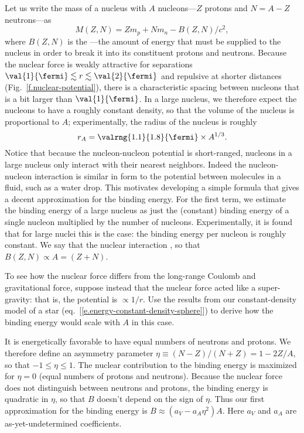  Let us write the mass of a nucleus with $A$ nucleons---$Z$ protons and $N=A-Z$ neutrons---as
\[
	M(Z,N) = Zm_{p} + Nm_{n} - B(Z,N)/c^{2},
\]
where $B(Z,N)$ is the ---the amount of energy that must be supplied to the nucleus in order to break it into its constituent protons and neutrons.
Because the nuclear force is weakly attractive for separations $\val{1}{\fermi}\lesssim r\lesssim\val{2}{\fermi}$ and repulsive at shorter distances (Fig.~\ref{f.nuclear-potential}), there is a characteristic spacing between nucleons that is a bit larger than $\val{1}{\fermi}$. In a large nucleus, we therefore expect the nucleons to have a roughly constant density, so that the volume of the nucleus is proportional to $A$; experimentally, the radius of the nucleus is roughly
\[
	r_{A} = \valrng{1.1}{1.8}{\fermi}\times A^{1/3}.
\]
Notice that because the nucleon-nucleon potential is short-ranged, nucleons in a large nucleus only interact with their nearest neighbors. Indeed the nucleon-nucleon interaction is similar in form to the potential between molecules in a fluid, such as a water drop. This motivates developing a simple formula that gives a decent approximation for the binding energy. For the first term, we estimate the binding energy of a large nucleus as just the (constant) binding energy of a single nucleon multiplied by the number of nucleons. Experimentally, it is found that for large nuclei this is the case: the binding energy per nucleon is roughly constant. We say that the nuclear interaction , so that $B(Z,N) \propto A = (Z+N)$.

\begin{exercisebox}
To see how the nuclear force differs from the long-range Coulomb and gravitational force, suppose instead that the nuclear force acted like a super-gravity: that is, the potential is $\propto 1/r$. Use the results from our constant-density model of a star (eq.~[\ref{e.energy-constant-density-sphere}]) to derive how the binding energy would scale with $A$ in this case.
\end{exercisebox}

It is energetically favorable to have equal numbers of neutrons and protons. We therefore define an asymmetry parameter $\eta \equiv (N-Z)/(N+Z) = 1-2Z/A$, so that $-1\le\eta\le1$. The nuclear contribution to the binding energy is maximized for $\eta = 0$ (equal numbers of protons and neutrons). Because the nuclear force does not distinguish between neutrons and protons, the binding energy is quadratic in $\eta$, so that $B$ doesn't depend on the sign of $\eta$. Thus our first approximation for the binding energy is $B \approx (a_{V} - a_{A}\eta^{2}) A$. Here $a_{V}$ and $a_{A}$ are as-yet-undetermined coefficients.

